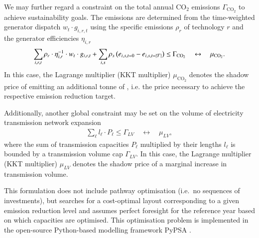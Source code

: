 We may further regard a constraint on the total annual CO$_2$ emissions $\Gamma_{\text{CO}_2}$
to achieve sustainability goals.
The emissions are determined from the time-weighted generator dispatch $ w_t \cdot g_{i,r,t}$ using the specific emissions $\rho_r$ of technology $r$
and the generator efficiencies $\eta_{i,r}$
\begin{align}
	\sum_{i,r,t}  \rho_r \cdot \eta_{i,r}^{-1} \cdot w_t \cdot g_{i,r,t} + \sum_{i,s} \rho_s \left(e_{i,s,t=0} - e_{i,s,t=\left|\mathcal{T}\right|}\right) \leq \Gamma_{\text{CO}_2}  \quad \leftrightarrow \quad \mu_{\text{CO}_2}.
\end{align}
In this case, the Lagrange multiplier (KKT multiplier) $\mu_{\text{CO}_2}$ denotes the shadow price of emitting an additional tonne of \co, i.e. the \co price necessary to achieve the respective \co emission reduction target.

Additionally, another global constraint may be set on the volume of electricity transmission network expansion
\begin{align}
    \sum_\ell l_\ell \cdot P_\ell \leq \Gamma_{LV} \quad \leftrightarrow \quad \mu_{LV},
\end{align}
where the sum of transmission capacities $P_\ell$ multiplied by their lengths $l_\ell$ is bounded by a transmission volume cap
$\Gamma_{LV}$. In this case, the Lagrange multiplier (KKT multiplier) $\mu_{LV}$ denotes the shadow price of a marginal increase in transmission volume.

This formulation does not include pathway optimisation (i.e.~no
sequences of investments), but searches for a cost-optimal layout corresponding
to a given \co emission reduction level and assumes perfect foresight for
the reference year based on which capacities are optimised. This optimisation
problem is implemented in the open-source Python-based modelling framework
PyPSA .
